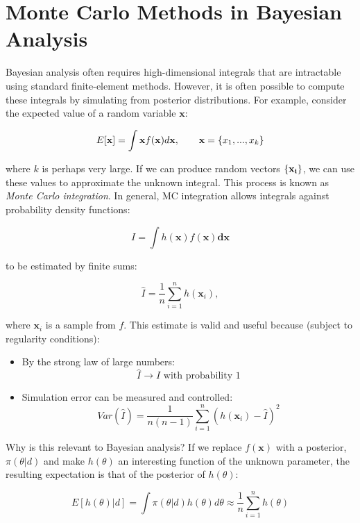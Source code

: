 
\hypertarget{monte-carlo-methods-in-bayesian-analysis}{}

\section*{Monte Carlo Methods in Bayesian Analysis}

Bayesian analysis often requires high-dimensional integrals that are intractable using standard finite-element methods. However, it is often possible to compute these integrals by simulating from posterior distributions. For example, consider the expected value of a random variable $\mathbf{x}$:

\[
E[{\bf x}] = \int {\bf x} f({\bf x}) d{\bf x}, \qquad
{\bf x} = \{x_1,...,x_k\}
\]

\noindent where $k$ is perhaps very large. If we can produce random vectors $\{{\bf x_i}\}$, we can use these values to approximate the unknown integral. This process is known as {\em Monte Carlo integration}. In general, MC integration allows integrals against probability density functions:

\[
I = \int h(\mathbf{x}) f(\mathbf{x}) \mathbf{dx}
\]

\noindent to be estimated by finite sums:

\[
\hat{I} = \frac{1}{n}\sum_{i=1}^n h(\mathbf{x}_i),
\]

\noindent where $\mathbf{x}_i$ is a sample from $f$. This estimate is valid and useful because (subject to regularity conditions):

\begin{itemize}
\item
By the strong law of large numbers:
\[\hat{I} \rightarrow I   \mbox{   with probability 1}\]
\item
Simulation error can be measured and controlled:
\[Var(\hat{I}) = \frac{1}{n(n-1)}\sum_{i=1}^n (h(\mathbf{x}_i)-\hat{I})^2\]
\end{itemize}

Why is this relevant to Bayesian analysis? If we replace $f(\mathbf{x})$ with a posterior, $\pi(\theta|d)$ and make $h(\theta)$ an interesting function of the unknown parameter, the resulting expectation is that of the posterior of $h(\theta)$:

\[
E[h(\theta)|d] = \int \pi(\theta|d) h(\theta) d\theta \approx \frac{1}{n}\sum_{i=1}^n h(\theta)
\]

